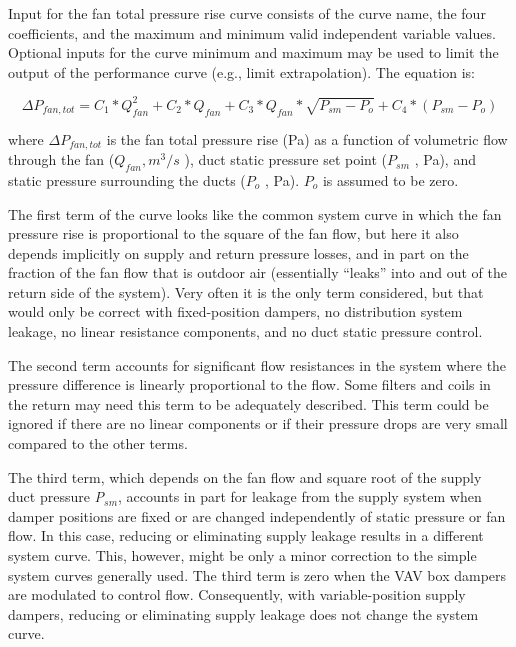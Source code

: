 Input for the fan total pressure rise curve consists of the curve name, the four coefficients, and the maximum and minimum valid independent variable values. Optional inputs for the curve minimum and maximum may be used to limit the output of the performance curve (e.g., limit extrapolation). The equation is:

\begin{equation}
\Delta {P_{fan,tot}} = {C_1}*Q_{fan}^2 + {C_2}*Q_{fan}^{} + {C_3}*Q_{fan}^{}*\sqrt {{P_{sm}} - {P_o}}  + {C_4}*\left( {{P_{sm}} - {P_o}} \right)
\end{equation}

where \(\Delta P_{fan,tot}\) is the fan total pressure rise (Pa) as a function of volumetric flow through the fan (\(Q_{fan}, m^3/s\) ), duct static pressure set point (\(P_{sm}\) , Pa), and static pressure surrounding the ducts (\(P_o\) , Pa). \(P_o\) is assumed to be zero.

The first term of the curve looks like the common system curve in which the fan pressure rise is proportional to the square of the fan flow, but here it also depends implicitly on supply and return pressure losses, and in part on the fraction of the fan flow that is outdoor air (essentially ``leaks'' into and out of the return side of the system). Very often it is the only term considered, but that would only be correct with fixed-position dampers, no distribution system leakage, no linear resistance components, and no duct static pressure control.

The second term accounts for significant flow resistances in the system where the pressure difference is linearly proportional to the flow. Some filters and coils in the return may need this term to be adequately described. This term could be ignored if there are no linear components or if their pressure drops are very small compared to the other terms.

The third term, which depends on the fan flow and square root of the supply duct pressure \emph{P\(_{sm}\)}, accounts in part for leakage from the supply system when damper positions are fixed or are changed independently of static pressure or fan flow. In this case, reducing or eliminating supply leakage results in a different system curve. This, however, might be only a minor correction to the simple system curves generally used. The third term is zero when the VAV box dampers are modulated to control flow. Consequently, with variable-position supply dampers, reducing or eliminating supply leakage does not change the system curve.

